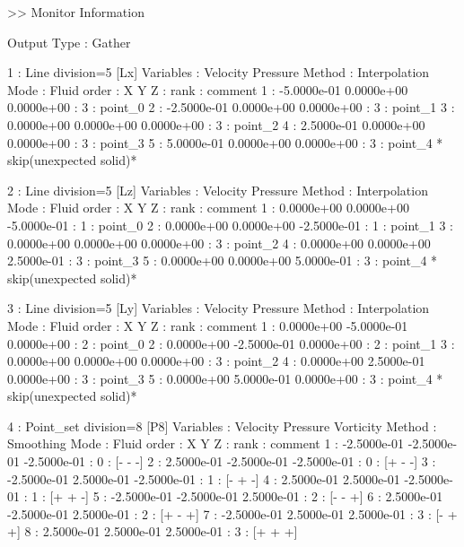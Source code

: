 {\small
\begin{program}
>> Monitor Information

  Output Type : Gather

  1 : Line   division=5  [Lx]
    Variables : Velocity Pressure 
       Method : Interpolation
         Mode : Fluid
        order :            X            Y            Z  :   rank : comment
            1 :  -5.0000e-01   0.0000e+00   0.0000e+00  :      3 : point_0
            2 :  -2.5000e-01   0.0000e+00   0.0000e+00  :      3 : point_1
            3 :   0.0000e+00   0.0000e+00   0.0000e+00  :      3 : point_2
            4 :   2.5000e-01   0.0000e+00   0.0000e+00  :      3 : point_3
            5 :   5.0000e-01   0.0000e+00   0.0000e+00  :      3 : point_4  *
skip(unexpected solid)*

  2 : Line   division=5  [Lz]
    Variables : Velocity Pressure 
       Method : Interpolation
         Mode : Fluid
        order :            X            Y            Z  :   rank : comment
            1 :   0.0000e+00   0.0000e+00  -5.0000e-01  :      1 : point_0
            2 :   0.0000e+00   0.0000e+00  -2.5000e-01  :      1 : point_1
            3 :   0.0000e+00   0.0000e+00   0.0000e+00  :      3 : point_2
            4 :   0.0000e+00   0.0000e+00   2.5000e-01  :      3 : point_3
            5 :   0.0000e+00   0.0000e+00   5.0000e-01  :      3 : point_4  *
skip(unexpected solid)*

  3 : Line   division=5  [Ly]
    Variables : Velocity Pressure 
       Method : Interpolation
         Mode : Fluid
        order :            X            Y            Z  :   rank : comment
            1 :   0.0000e+00  -5.0000e-01   0.0000e+00  :      2 : point_0
            2 :   0.0000e+00  -2.5000e-01   0.0000e+00  :      2 : point_1
            3 :   0.0000e+00   0.0000e+00   0.0000e+00  :      3 : point_2
            4 :   0.0000e+00   2.5000e-01   0.0000e+00  :      3 : point_3
            5 :   0.0000e+00   5.0000e-01   0.0000e+00  :      3 : point_4  *
skip(unexpected solid)*

  4 : Point_set  division=8  [P8]
    Variables : Velocity Pressure Vorticity 
       Method : Smoothing
         Mode : Fluid
        order :            X            Y            Z  :   rank : comment
            1 :  -2.5000e-01  -2.5000e-01  -2.5000e-01  :      0 : [- - -]
            2 :   2.5000e-01  -2.5000e-01  -2.5000e-01  :      0 : [+ - -]
            3 :  -2.5000e-01   2.5000e-01  -2.5000e-01  :      1 : [- + -]
            4 :   2.5000e-01   2.5000e-01  -2.5000e-01  :      1 : [+ + -]
            5 :  -2.5000e-01  -2.5000e-01   2.5000e-01  :      2 : [- - +]
            6 :   2.5000e-01  -2.5000e-01   2.5000e-01  :      2 : [+ - +]
            7 :  -2.5000e-01   2.5000e-01   2.5000e-01  :      3 : [- + +]
            8 :   2.5000e-01   2.5000e-01   2.5000e-01  :      3 : [+ + +]


\end{program}}
